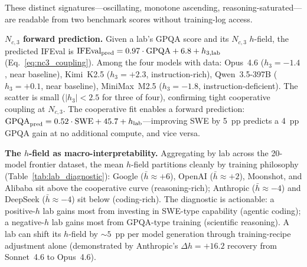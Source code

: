 \documentclass[11pt]{article}
\begin{document}
\smallskip\noindent These distinct signatures---oscillating, monotone ascending, reasoning-saturated---are readable from two benchmark scores without training-log access.

\textbf{$N_{c,3}$ forward prediction.}
Given a lab's GPQA score and its $N_{c,3}$ $h$-field, the predicted IFEval is
$\text{IFEval}_{\rm pred} = 0.97\cdot\text{GPQA} + 6.8 + h_{3,\rm lab}$ (Eq.~\ref{eq:nc3_coupling}).
Among the four models with data: Opus~4.6 ($h_3 = -1.4$, near baseline),
Kimi~K2.5 ($h_3 = +2.3$, instruction-rich),
Qwen~3.5-397B ($h_3 = +0.1$, near baseline),
MiniMax~M2.5 ($h_3 = -1.8$, instruction-deficient).
The scatter is small ($|h_3| < 2.5$ for three of four), confirming tight cooperative coupling at $N_{c,3}$.
The cooperative fit enables a forward prediction: $\text{GPQA}_{\rm pred} = 0.52\cdot\text{SWE} + 45.7 + h_{\rm lab}$---improving SWE by 5~pp predicts a 4~pp GPQA gain at no additional compute, and vice versa.

\textbf{The $h$-field as macro-interpretability.}
Aggregating by lab across the 20-model frontier dataset, the mean $h$-field partitions cleanly by training philosophy (Table~\ref{tab:lab_diagnostic}):
Google ($\bar{h} \approx +6$), OpenAI ($\bar{h} \approx +2$), Moonshot, and Alibaba sit above the cooperative curve (reasoning-rich); Anthropic ($\bar{h} \approx -4$) and DeepSeek ($\bar{h} \approx -4$) sit below (coding-rich).
The diagnostic is actionable: a positive-$h$ lab gains most from investing in SWE-type capability (agentic coding); a negative-$h$ lab gains most from GPQA-type training (scientific reasoning).
A lab can shift its $h$-field by ${\sim}5$~pp per model generation through training-recipe adjustment alone (demonstrated by Anthropic's $\Delta h = +16.2$ recovery from Sonnet~4.6 to Opus~4.6).
\end{document}
